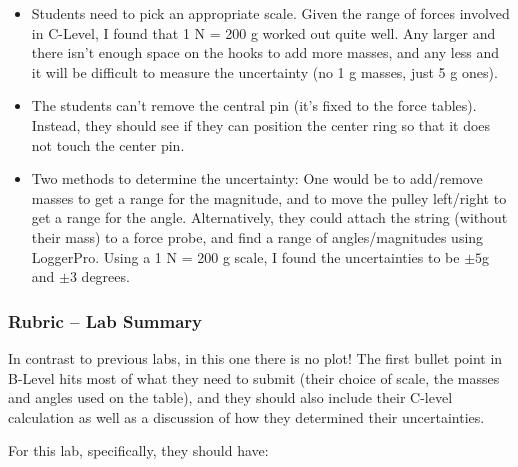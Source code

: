 \documentclass[fleqn,letterpaper]{article}
\begin{document}
\begin{itemize}
\item{Students need to pick an appropriate scale.  Given the range of forces involved in C-Level, I found that 1 N = 200 g worked out quite well.  Any larger and there isn't enough space on the hooks to add more masses, and any less and it will be difficult to measure the uncertainty (no 1 g masses, just 5 g ones).}
\item{The students can't remove the central pin (it's fixed to the force tables).  Instead, they should see if they can position the center ring so that it does not touch the center pin.}
\item{Two methods to determine the uncertainty:  One would be to add/remove masses to get a range for the magnitude, and to move the pulley left/right to get a range for the angle.  Alternatively, they could attach the string (without their mass) to a force probe, and find a range of angles/magnitudes using LoggerPro.  Using a 1 N = 200 g scale, I found the uncertainties to be $\pm 5$g and $\pm 3$ degrees.}
\end{itemize}

\subsubsection*{Rubric -- Lab Summary}

In contrast to previous labs, in this one there is no plot!  The first bullet point in B-Level hits most of what they need to submit (their choice of scale, the masses and angles used on the table), and they should also include their C-level calculation as well as a discussion of how they determined their uncertainties.

For this lab, specifically, they should have:
\end{document}
